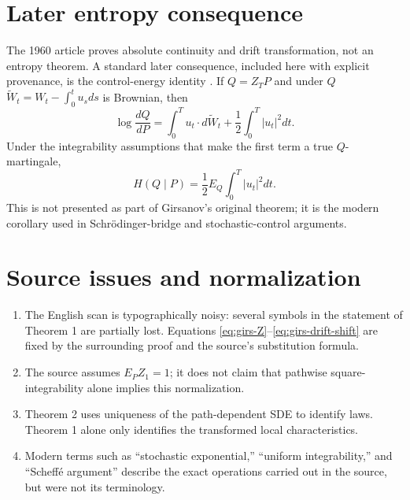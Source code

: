 \section{Later entropy consequence}
The 1960 article proves absolute continuity and drift transformation, not an entropy theorem.
A standard later consequence, included here with explicit provenance, is the control-energy identity
\cite{Leonard2012Girsanov,RogersWilliams2000}.  If \(Q=Z_TP\) and under \(Q\)
\(\widetilde W_t=W_t-\int_0^tu_sds\) is Brownian, then
\[
 \log\frac{dQ}{dP}
 =\int_0^Tu_t\cdot d\widetilde W_t+
   \frac12\int_0^T|u_t|^2dt.
\]
Under the integrability assumptions that make the first term a true \(Q\)-martingale,
\begin{equation}\label{eq:girs-entropy-energy}
 H(Q\mid P)=\frac12E_Q\int_0^T|u_t|^2dt.
\end{equation}
This is not presented as part of Girsanov's original theorem; it is the modern corollary used in
Schr\"odinger-bridge and stochastic-control arguments.

\section{Source issues and normalization}
\begin{enumerate}[leftmargin=2em]
\item The English scan is typographically noisy: several symbols in the statement of Theorem 1
are partially lost.  Equations \eqref{eq:girs-Z}--\eqref{eq:girs-drift-shift} are fixed by the
surrounding proof and the source's substitution formula.
\item The source assumes \(E_PZ_1=1\); it does not claim that pathwise square-integrability alone
implies this normalization.
\item Theorem 2 uses uniqueness of the path-dependent SDE to identify laws.  Theorem 1 alone only
identifies the transformed local characteristics.
\item Modern terms such as ``stochastic exponential,'' ``uniform integrability,'' and ``Scheff\'e
argument'' describe the exact operations carried out in the source, but were not its terminology.
\end{enumerate}




